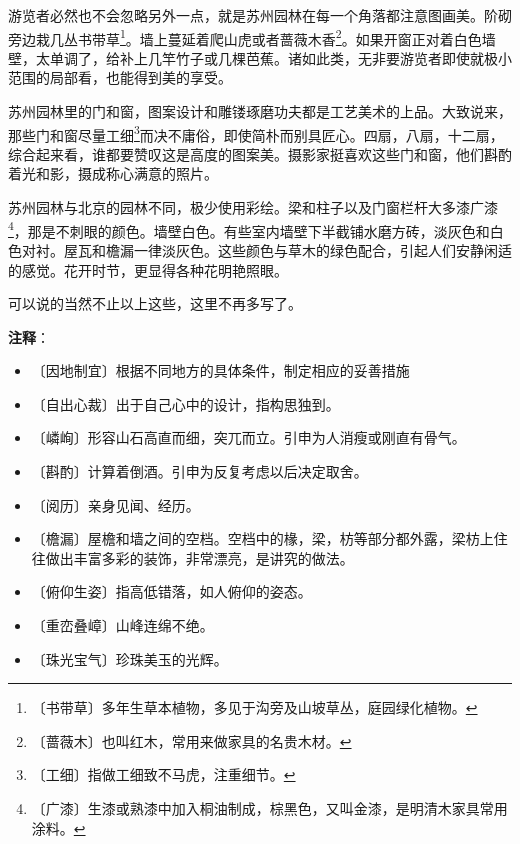 \documentclass[12pt,UTF-8,openany]{ctexbook}
\begin{document}
\begin{normalsize}
    游览者必然也不会忽略另外一点，就是苏州园林在每一个角落都注意图画美。阶砌旁边栽几丛书带草\footnote{〔书带草〕多年生草本植物，多见于沟旁及山坡草丛，庭园绿化植物。}。墙上蔓延着爬山虎或者蔷薇木香\footnote{〔蔷薇木〕也叫红木，常用来做家具的名贵木材。}。如果开窗正对着白色墙壁，太单调了，给补上几竿竹子或几棵芭蕉。诸如此类，无非要游览者即使就极小范围的局部看，也能得到美的享受。
    
    苏州园林里的门和窗，图案设计和雕镂琢磨功夫都是工艺美术的上品。大致说来，那些门和窗尽量工细\footnote{〔工细〕指做工细致不马虎，注重细节。}而决不庸俗，即使简朴而别具匠心。四扇，八扇，十二扇，综合起来看，谁都要赞叹这是高度的图案美。摄影家挺喜欢这些门和窗，他们斟酌着光和影，摄成称心满意的照片。
    
    苏州园林与北京的园林不同，极少使用彩绘。梁和柱子以及门窗栏杆大多漆广漆\footnote{〔广漆〕生漆或熟漆中加入桐油制成，棕黑色，又叫金漆，是明清木家具常用涂料。}，那是不刺眼的颜色。墙壁白色。有些室内墙壁下半截铺水磨方砖，淡灰色和白色对衬。屋瓦和檐漏一律淡灰色。这些颜色与草木的绿色配合，引起人们安静闲适的感觉。花开时节，更显得各种花明艳照眼。
    
    可以说的当然不止以上这些，这里不再多写了。
    
\end{normalsize}


\newpage

\textbf{注释}：

\vspace{-1em}

\begin{itemize}
    \setlength\itemsep{-0.2em}
    \item 〔因地制宜〕根据不同地方的具体条件，制定相应的妥善措施
    \item 〔自出心裁〕出于自己心中的设计，指构思独到。
    \item 〔嶙峋〕形容山石高直而细，突兀而立。引申为人消瘦或刚直有骨气。
    \item 〔斟酌〕计算着倒酒。引申为反复考虑以后决定取舍。
    \item 〔阅历〕亲身见闻、经历。
    \item 〔檐漏〕屋檐和墙之间的空档。空档中的椽，梁，枋等部分都外露，梁枋上住往做出丰富多彩的装饰，非常漂亮，是讲究的做法。
    \item 〔俯仰生姿〕指高低错落，如人俯仰的姿态。
    \item 〔重峦叠嶂〕山峰连绵不绝。
    \item 〔珠光宝气〕珍珠美玉的光辉。
\end{itemize}
\end{document}
